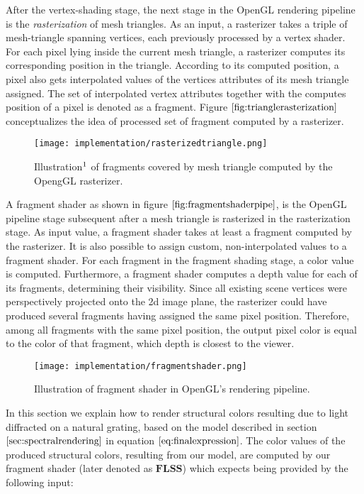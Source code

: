 After the vertex-shading stage, the next stage in the OpenGL rendering pipeline is the \emph{rasterization} of mesh triangles. As an input, a rasterizer takes a triple of mesh-triangle spanning vertices, each previously processed by a vertex shader. For each pixel lying inside the current mesh triangle, a rasterizer computes its corresponding position in the triangle. According to its computed position, a pixel also gets interpolated values of the vertices attributes of its mesh triangle assigned. The set of interpolated vertex attributes together with the computes position of a pixel is denoted as a fragment. Figure $\ref{fig:trianglerasterization}$ conceptualizes the idea of processed set of fragment computed by a rasterizer.

\begin{figure}[H]
  \centering
  \texttt{[image: implementation/rasterizedtriangle.png]}
  \caption[Triangle Rasterization]{Illustration$\footnotemark$ of fragments covered by mesh triangle computed by the OpengGL rasterizer.}
  \label{fig:trianglerasterization}
\end{figure}

A fragment shader as shown in figure $\ref{fig:fragmentshaderpipe}$, is the OpenGL pipeline stage subsequent after a mesh triangle is rasterized in the rasterization stage. As input value, a fragment shader takes at least a fragment computed by the rasterizer. It is also possible to assign custom, non-interpolated values to a fragment shader. For each fragment in the fragment shading stage, a color value is computed. Furthermore, a fragment shader computes a depth value for each of its fragments, determining their visibility. Since all existing scene vertices were perspectively projected onto the 2d image plane, the rasterizer could have produced several fragments having assigned the same pixel position. Therefore, among all fragments with the same pixel position, the output pixel color is equal to the color of that fragment, which depth is closest to the viewer.

\begin{figure}[H]
  \centering
  \texttt{[image: implementation/fragmentshader.png]}
  \caption[Fragment Shader]{Illustration of fragment shader in OpenGL's rendering pipeline.}
  \label{fig:fragmentshaderpipe}
\end{figure}

\label{sec:flssshader}
\label{sec:inputlists}
In this section we explain how to render structural colors resulting due to light diffracted on a natural grating, based on the model described in section $\ref{sec:spectralrendering}$ in equation $\ref{eq:finalexpression}$. The color values of the produced structural colors, resulting from our model, are computed by our fragment shader (later denoted as $\textbf{FLSS}$) which expects being provided by the following input:

